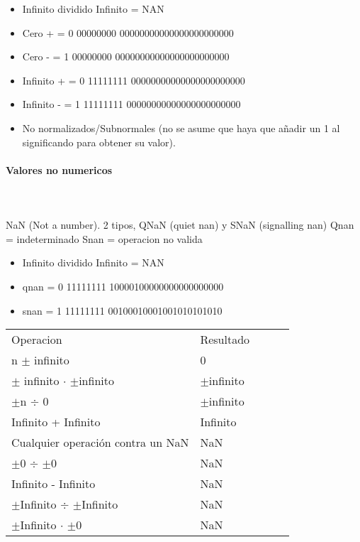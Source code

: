 \begin{itemize}
\item Infinito dividido Infinito = NAN
\item Cero + = 0 00000000 00000000000000000000000
\item Cero - = 1 00000000 00000000000000000000000
\item Infinito + = 0 11111111 00000000000000000000000
\item Infinito - = 1 11111111 00000000000000000000000
\item No normalizados/Subnormales (no se asume que haya que añadir un 1 al significando para obtener su valor).
\end{itemize}

\paragraph{Valores no numericos}\mbox{}\\\\
NaN (Not a number). 2 tipos, QNaN (quiet nan) y SNaN (signalling nan) Qnan = indeterminado Snan = operacion no valida

\begin{itemize}
\item Infinito dividido Infinito = NAN
\item qnan = 0 11111111 10000100000000000000000
\item snan = 1 11111111 00100010001001010101010
\end{itemize}

\begin{table}[h]
\begin{tabular}{lllll}
\cline{1-2}
\multicolumn{1}{|l|}{Operacion} & \multicolumn{1}{l|}{Resultado} &   \\ \cline{1-2}
\multicolumn{1}{|l|}{n $\pm$ infinito } & \multicolumn{1}{l|}{0} &   \\ \cline{1-2}
\multicolumn{1}{|l|}{$\pm$ infinito $\cdot$ $\pm$infinito } & \multicolumn{1}{l|}{$\pm$infinito} &   \\ \cline{1-2}
\multicolumn{1}{|l|}{ $\pm$n $\div$ 0   } & \multicolumn{1}{l|}{ $\pm$infinito } &   \\ \cline{1-2}
\multicolumn{1}{|l|}{ Infinito + Infinito   } & \multicolumn{1}{l|}{ Infinito } &   \\ \cline{1-2}
\multicolumn{1}{|l|}{Cualquier operación contra un NaN   } & \multicolumn{1}{l|}{ NaN } &   \\ \cline{1-2}
\multicolumn{1}{|l|}{ $\pm$0 $\div$ $\pm$0   } & \multicolumn{1}{l|}{ NaN } &   \\ \cline{1-2}
\multicolumn{1}{|l|}{ Infinito - Infinito   } & \multicolumn{1}{l|}{  NaN} &   \\ \cline{1-2}
\multicolumn{1}{|l|}{ $\pm$Infinito  $\div$ $\pm$Infinito  } & \multicolumn{1}{l|}{  NaN} &   \\ \cline{1-2}
\multicolumn{1}{|l|}{ $\pm$Infinito  $\cdot$ $\pm$0 } & \multicolumn{1}{l|}{  NaN} &   \\ \cline{1-2}
\end{tabular}
\end{table}


